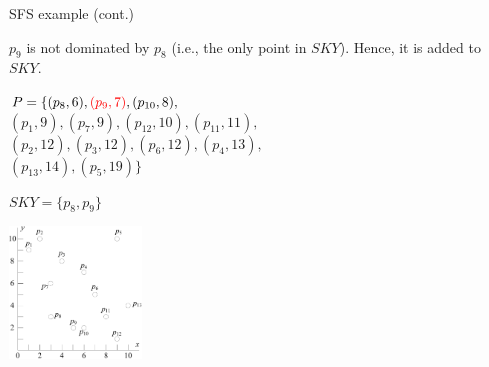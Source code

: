 \documentclass{beamer}
\def\vgap{\vspace{5mm}}
\newcommand{\red}[1]{\textcolor{red}{#1}}
\begin{document}
    \begin{frame}{SFS example (cont.)}
    \begin{small} \label{fra:sfs-sort}
		$p_9$ is not dominated by $p_8$ (i.e., the only point in $SKY$). Hence, it is added to $SKY$.

		\vgap

        \begin{minipage}[b]{0.5\linewidth}
            $P = \{(p_8, 6), \red{(p_9, 7)}, (p_{10}, 8),$ \\
            $(p_1, 9), (p_7, 9), (p_{12}, 10), (p_{11}, 11),$ \\
            $(p_2, 12), (p_3, 12), (p_6, 12), (p_4, 13),$ \\
            $(p_{13}, 14), (p_5, 19)\}$ \vspace{10mm}

			$SKY = \{p_8, p_9\}$
        \end{minipage}
        \begin{minipage}[b]{0.45\linewidth}
            \begin{center}
                \includegraphics[height=35mm]{./artwork/data.pdf}
            \end{center}
        \end{minipage}
    \end{small}
    \end{frame}
\end{document}
